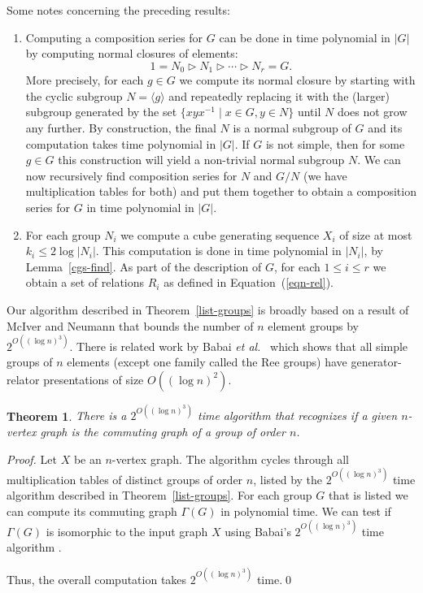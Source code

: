 \documentclass{elsarticle}
\newtheorem{theorem}{Theorem}[section]
\renewcommand{\angle}[1]{\langle#1\rangle} %
\begin{document}
\begin{remark}
Some notes concerning the preceding results:
\begin{enumerate}
\item Computing a composition series for $G$ can be done in
  time polynomial in $|G|$ by computing normal closures of elements:
  \[
1=N_0\rhd N_1\rhd \cdots \rhd N_r=G.
\]
More precisely, for each $g\in G$ we compute its normal closure by
starting with the cyclic subgroup $N=\angle{g}$ and repeatedly
replacing it with the (larger) subgroup generated by the set
$\{xyx^{-1}\mid x\in G, y\in N\}$ until $N$ does not grow any further.
By construction, the final $N$ is a normal subgroup of $G$ and its
computation takes time polynomial in $|G|$. If $G$ is not simple, then
for some $g\in G$ this construction will yield a non-trivial normal
subgroup $N$. We can now recursively find composition series for $N$
and $G/N$ (we have multiplication tables for both) and put them
together to obtain a composition series for $G$ in time polynomial in
$|G|$.


\item For each group $N_i$ we compute a cube generating sequence $X_i$
  of size at most $k_i\le 2\log |N_i|$. This computation is done in
  time polynomial in $|N_i|$, by Lemma~\ref{cgs-find}. As part of the
  description  of $G$, for each $1\le i\le r$ we obtain a set of
  relations $R_i$ as defined in Equation~(\ref{eqn-rel}).
\end{enumerate}

Our algorithm described in Theorem~\ref{list-groups} is broadly based
on a result of McIver and Neumann \cite{MN87} that bounds the number
of $n$ element groups by $2^{O((\log n)^3)}$. There is related work by
Babai \textit{et al.}~\cite{Bab} which shows that all simple groups of
$n$ elements (except one family called the Ree groups) have
generator-relator presentations of size $O((\log n)^2)$.
\end{remark}

\begin{theorem}\label{quasipoly-thm}
There is a $2^{O((\log n)^3)}$ time algorithm that recognizes if a given
$n$-vertex graph is the commuting graph of a group of order $n$.
\end{theorem}

\begin{proof}
  Let $X$ be an $n$-vertex graph. The algorithm cycles through all
  multiplication tables of distinct groups of order $n$, listed by the
  $2^{O((\log n)^3)}$ time algorithm described in
  Theorem~\ref{list-groups}. For each group $G$ that is listed we can
  compute its commuting graph $\Gamma(G)$ in polynomial time.  We can
  test if $\Gamma(G)$ is isomorphic to the input graph $X$ using
  Babai's $2^{O((\log n)^3)}$ time algorithm \cite{B16}.

Thus, the overall computation takes $2^{O((\log n)^3)}$ time.\qed
\end{proof}
\end{document}

